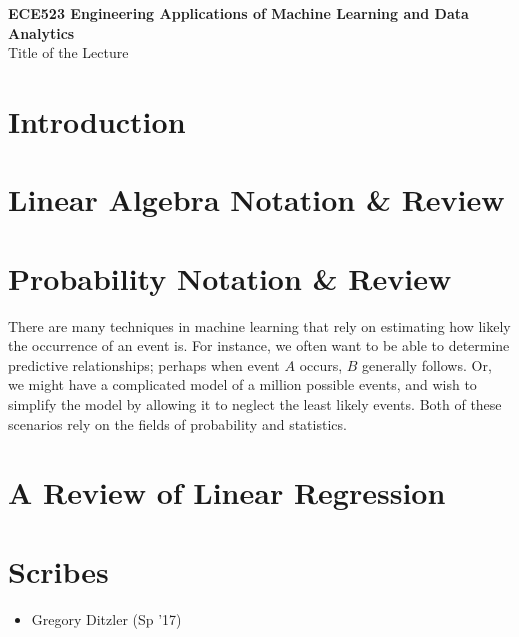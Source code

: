 \documentclass[12pt,fleqn]{article}
\begin{document}
\pagestyle{fancy}
\rfoot{\today}



\begin{center}\Large
{\bf ECE523 Engineering Applications of Machine Learning and Data Analytics \\}
Title of the Lecture  
\end{center}




\section{Introduction}


\section{Linear Algebra Notation \& Review}



\section{Probability Notation \& Review}
There are many techniques in machine learning that rely on estimating how likely the occurrence of an event is. For instance, we often want to be able to determine predictive relationships; perhaps when event $A$ occurs, $B$ generally follows. Or, we might have a complicated model of a million possible events, and wish to simplify the model by allowing it to neglect the least likely events. Both of these scenarios rely on the fields of probability and statistics.



\section{A Review of Linear Regression}


\section*{Scribes}
\begin{itemize}
\item Gregory Ditzler (Sp '17)
\end{itemize}

\nocite{DorfBook}


\end{document}
